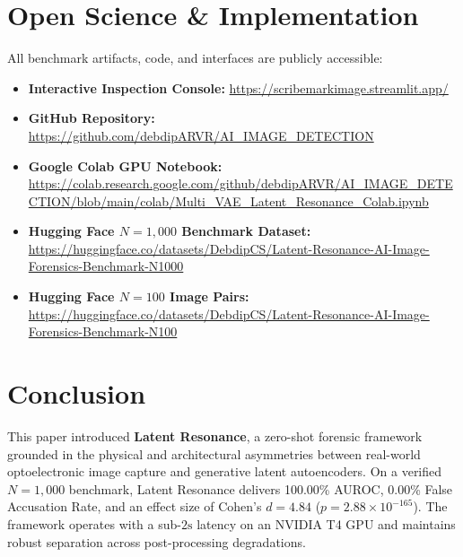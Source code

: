 \documentclass[conference]{IEEEtran}
\begin{document}
\section{Open Science \& Implementation}
\label{sec:reproducibility}

All benchmark artifacts, code, and interfaces are publicly accessible:
\begin{itemize}
    \item \textbf{Interactive Inspection Console:} \url{https://scribemarkimage.streamlit.app/}
    \item \textbf{GitHub Repository:} \url{https://github.com/debdipARVR/AI_IMAGE_DETECTION}
    \item \textbf{Google Colab GPU Notebook:} \url{https://colab.research.google.com/github/debdipARVR/AI_IMAGE_DETECTION/blob/main/colab/Multi_VAE_Latent_Resonance_Colab.ipynb}
    \item \textbf{Hugging Face $N=1,000$ Benchmark Dataset:} \url{https://huggingface.co/datasets/DebdipCS/Latent-Resonance-AI-Image-Forensics-Benchmark-N1000}
    \item \textbf{Hugging Face $N=100$ Image Pairs:} \url{https://huggingface.co/datasets/DebdipCS/Latent-Resonance-AI-Image-Forensics-Benchmark-N100}
\end{itemize}

\section{Conclusion}
\label{sec:conclusion}

This paper introduced \textbf{Latent Resonance}, a zero-shot forensic framework grounded in the physical and architectural asymmetries between real-world optoelectronic image capture and generative latent autoencoders. On a verified $N=1,000$ benchmark, Latent Resonance delivers 100.00\% AUROC, 0.00\% False Accusation Rate, and an effect size of Cohen's $d = 4.84$ ($p = 2.88 \times 10^{-165}$). The framework operates with a sub-$2\text{s}$ latency on an NVIDIA T4 GPU and maintains robust separation across post-processing degradations.



\end{document}
